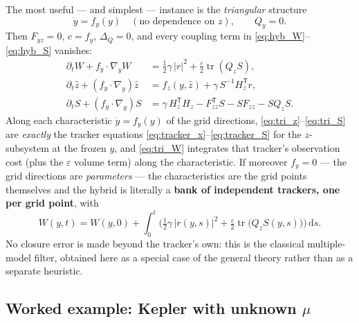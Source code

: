 \documentclass[11pt,a4paper]{article}
\newcommand{\dd}{\,\mathrm{d}}
\newcommand{\tr}{\operatorname{tr}}
\newcommand{\T}{^{\mathsf T}}
\newcommand{\zh}{\hat{z}}
\newcommand{\eps}{\varepsilon}
\newcommand{\abs}[1]{\left\lvert #1 \right\rvert}
\newcommand{\gy}{\nabla_{\!y}}
\theoremstyle{plain}
\theoremstyle{definition}
\theoremstyle{remark}
\begin{document}
The most useful --- and simplest --- instance is the \emph{triangular} structure
\begin{equation}
  \dot y = f_y(y) \quad(\text{no dependence on } z), \qquad Q_y = 0 .
  \label{eq:triangular}
\end{equation}
Then $F_{yz}=0$, $c = f_y$, $\Delta_Q=0$, and every coupling term in \eqref{eq:hyb_W}--\eqref{eq:hyb_S} vanishes:
\begin{align}
  \partial_t W + f_y\cdot\gy W &= \tfrac12\gamma\,\abs{r}^2 + \tfrac{\eps}{2}\tr(Q_zS), \label{eq:tri_W}\\
  \partial_t\zh + (f_y\cdot\gy)\zh &= f_z(y,\zh) + \gamma\,S^{-1}H_z\T r, \label{eq:tri_z}\\
  \partial_t S + (f_y\cdot\gy)S &= \gamma\,H_z\T H_z - F_{zz}\T S - SF_{zz} - SQ_zS . \label{eq:tri_S}
\end{align}
Along each characteristic $\dot y = f_y(y)$ of the grid directions, \eqref{eq:tri_z}--\eqref{eq:tri_S} are \emph{exactly} the tracker equations \eqref{eq:tracker_x}--\eqref{eq:tracker_S} for the $z$-subsystem at the frozen $y$, and \eqref{eq:tri_W} integrates that tracker's observation cost (plus the $\eps$ volume term) along the characteristic. If moreover $f_y=0$ --- the grid directions are \emph{parameters} --- the characteristics are the grid points themselves and the hybrid is literally a \textbf{bank of independent trackers, one per grid point}, with
\begin{equation}
  W(y,t) = W(y,0) + \int_0^t\Big(\tfrac12\gamma\,\abs{r(y,s)}^2 + \tfrac{\eps}{2}\tr\big(Q_zS(y,s)\big)\Big)\dd s .
  \label{eq:bank_W}
\end{equation}
No closure error is made beyond the tracker's own: this is the classical multiple-model filter, obtained here as a special case of the general theory rather than as a separate heuristic.

\subsection{Worked example: Kepler with unknown \texorpdfstring{$\mu$}{mu}}
\label{sec:kepler}
\end{document}
